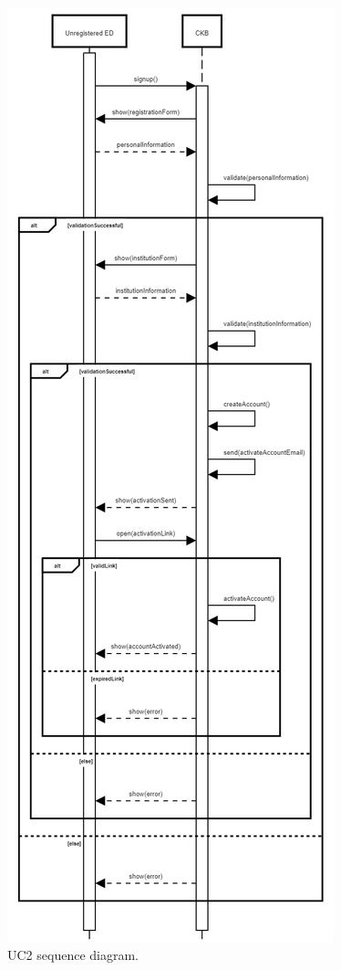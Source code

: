 \begin{center}
  \begin{figure} [H]
    \begin{center}
        \includegraphics[width=\textwidth,height=\textheight,keepaspectratio]{Images/UseCaseDiagrams/UC2.png}
        \caption{UC2 sequence diagram.}
        \label{fig: UC2_sequence_diagram}
    \end{center}
  \end{figure}
\end{center}

